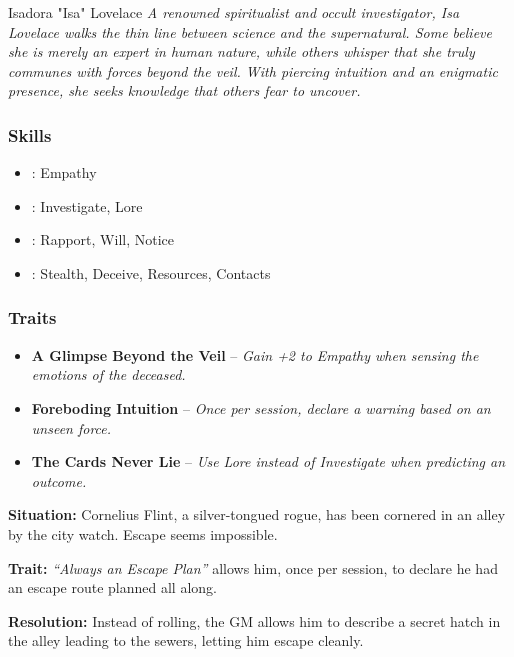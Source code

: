 \begin{WyrdNPC}[float=!b]{Isadora "Isa" Lovelace}
	\emph{A renowned spiritualist and occult investigator, Isa Lovelace walks the thin line between science and the supernatural. Some believe she is merely an expert in human nature, while others whisper that she truly communes with forces beyond the veil. With piercing intuition and an enigmatic presence, she seeks knowledge that others fear to uncover.}

	\subsubsection*{Skills}
	\begin{itemize}
    	\item \Expert: Empathy
	    \item \Skilled: Investigate, Lore
    	\item \Novice: Rapport, Will, Notice
	    \item \Untrained: Stealth, Deceive, Resources, Contacts
	\end{itemize}

	\subsubsection*{Traits}
	\begin{itemize}
    	\item \textbf{A Glimpse Beyond the Veil} – \emph{Gain +2 to Empathy when sensing the emotions of the deceased.}
	    \item \textbf{Foreboding Intuition} – \emph{Once per session, declare a warning based on an unseen force.}
    	\item \textbf{The Cards Never Lie} – \emph{Use Lore instead of Investigate when predicting an outcome.}
	\end{itemize}
\end{WyrdNPC}

\begin{WyrdExample}
	\textbf{Situation:} Cornelius Flint, a silver-tongued rogue, has been cornered in an alley by the city watch. Escape seems impossible.

	\noindent\textbf{Trait:} \emph{“Always an Escape Plan”} allows him, once per session, to declare he had an escape route planned all along.

	\noindent\textbf{Resolution:} Instead of rolling, the GM allows him to describe a secret hatch in the alley leading to the sewers, letting him escape cleanly.
\end{WyrdExample}
 
